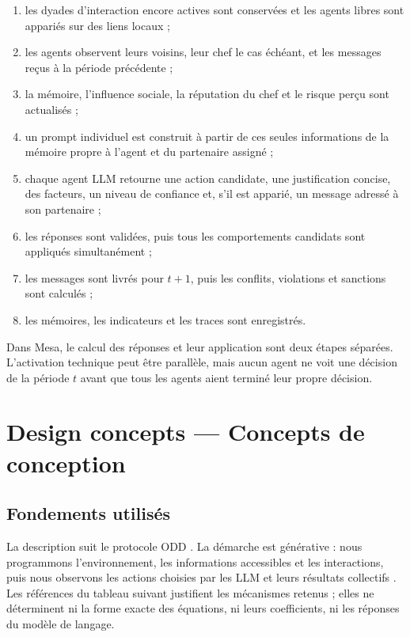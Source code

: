 \documentclass[10pt,a4paper]{article}
\begin{document}
\begin{enumerate}
  \item les dyades d’interaction encore actives sont conservées et les agents
  libres sont appariés sur des liens locaux ;
  \item les agents observent leurs voisins, leur chef le cas échéant, et les
  messages reçus à la période précédente ;
  \item la mémoire, l’influence sociale, la réputation du chef et le risque
  perçu sont actualisés ;
  \item un prompt individuel est construit à partir de ces seules informations
  de la mémoire propre à l’agent et du partenaire assigné ;
  \item chaque agent LLM retourne une action candidate, une justification
  concise, des facteurs, un niveau de confiance et, s’il est apparié, un
  message adressé à son partenaire ;
  \item les réponses sont validées, puis tous les comportements candidats sont
  appliqués simultanément ;
  \item les messages sont livrés pour $t+1$, puis les conflits, violations et
  sanctions sont calculés ;
  \item les mémoires, les indicateurs et les traces sont enregistrés.
\end{enumerate}

Dans Mesa, le calcul des réponses et leur application sont deux étapes
séparées. L’activation technique peut être parallèle, mais aucun agent ne voit
une décision de la période $t$ avant que tous les agents aient terminé leur
propre décision.

\section{Design concepts — Concepts de conception}

\subsection{Fondements utilisés}

La description suit le protocole ODD \cite{grimm2020}. La démarche est
générative : nous programmons l’environnement, les informations accessibles et
les interactions, puis nous observons les actions choisies par les LLM et leurs
résultats collectifs \cite{epstein1996}. Les références du tableau suivant
justifient les mécanismes retenus ; elles ne déterminent ni la forme exacte des
équations, ni leurs coefficients, ni les réponses du modèle de langage.
\end{document}
